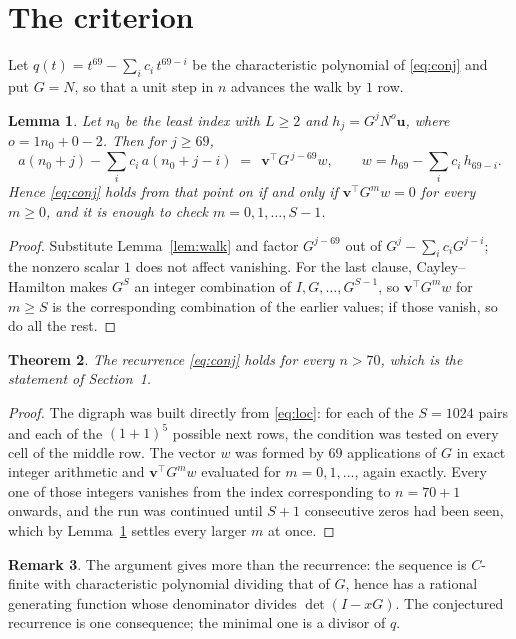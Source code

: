 \documentclass[11pt,a4paper]{article}
\theoremstyle{plain}
\newtheorem{theorem}{Theorem}
\newtheorem{lemma}[theorem]{Lemma}
\theoremstyle{definition}
\newtheorem{remark}[theorem]{Remark}
\begin{document}
\section{The criterion}

Let $q(t)=t^{69}-\sum_i c_i\,t^{69-i}$ be the characteristic polynomial of
\eqref{eq:conj} and put $G=N$, so that a unit step in $n$ advances the walk by
$1$ row.

\begin{lemma}\label{lem:crit}
Let $n_0$ be the least index with $L\ge2$ and $h_j=G^{j}N^{o}\mathbf{u}$, where
$o=1n_0+0-2$. Then for $j\ge69$,
\[
a(n_0+j)-\sum_i c_i\,a(n_0+j-i)\;=\;\,\mathbf{v}^{\!\top}G^{\,j-69}w,
\qquad w=h_{69}-\sum_i c_i\,h_{69-i} .
\]
Hence \eqref{eq:conj} holds from that point on if and only if
$\mathbf{v}^{\!\top}G^{m}w=0$ for every $m\ge0$, and it is enough to check
$m=0,1,\dots,S-1$.
\end{lemma}

\begin{proof}
Substitute Lemma~\ref{lem:walk} and factor $G^{j-69}$ out of
$G^{j}-\sum_ic_iG^{j-i}$; the nonzero scalar $1$ does not affect
vanishing. For the last clause, Cayley--Hamilton makes $G^{S}$ an integer combination of
$I,G,\dots,G^{S-1}$, so $\mathbf{v}^{\!\top}G^{m}w$ for $m\ge S$ is the corresponding
combination of the earlier values; if those vanish, so do all the rest.
\end{proof}

\begin{theorem}
The recurrence \eqref{eq:conj} holds for every $n>70$, which is the statement of
Section~1.
\end{theorem}

\begin{proof}
The digraph was built directly from \eqref{eq:loc}: for each of the $S=1024$ pairs and each
of the $(1+1)^{5}$ possible next rows, the condition was tested on every cell of
the middle row. The vector $w$ was formed by $69$ applications of $G$ in exact integer
arithmetic and $\mathbf{v}^{\!\top}G^{m}w$ evaluated for $m=0,1,\dots$, again exactly.
Every one of those integers vanishes from the index corresponding to $n=70+1$ onwards,
and the run was continued until $S+1$ consecutive zeros had been seen, which by
Lemma~\ref{lem:crit} settles every larger $m$ at once.
\end{proof}

\begin{remark}
The argument gives more than the recurrence: the sequence is $C$-finite with characteristic
polynomial dividing that of $G$, hence has a rational generating function whose denominator
divides $\det(I-xG)$. The conjectured recurrence is one consequence; the minimal one is a
divisor of $q$.
\end{remark}
\end{document}
